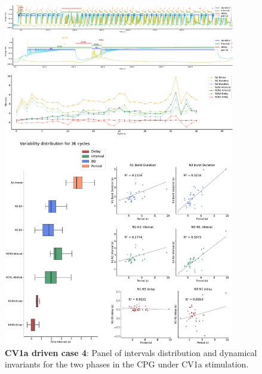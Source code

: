 \begin{figure}[htbp]
	\centering
	\includegraphics[width=0.9\textwidth]{./img/invariants/data/SUSSEX/CV1a_driven3/images/panel_with_intervals.pdf}
	\caption{\textbf{CV1a driven case 4}: Panel of intervals distribution and dynamical invariants for the two phases in the CPG under CV1a stimulation.}
	\label{fig:cv1a 3 2phases}
\end{figure}




